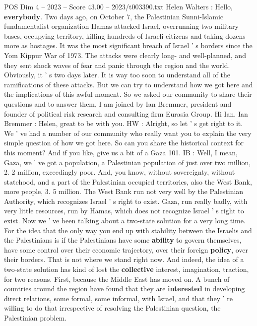 \begin{textsample}{POS Dim 4 – 2023 – Score 43.00 – 2023/t003390.txt}  \label{ex:f4_pos_031}
Helen Walters : Hello, \textbf{everybody}.
Two days ago, on October 7, the Palestinian Sunni-Islamic fundamentalist organization Hamas attacked Israel, overrunning two military bases, occupying territory, killing hundreds of Israeli citizens and taking dozens more as hostages.
It was the most significant breach of Israel ' s borders since the Yom Kippur War of 1973.
The attacks were clearly long- and well-planned, and they sent shock waves of fear and panic through the region and the world.
Obviously, it ' s two days later.
It is way too soon to understand all of the ramifications of these attacks.
But we can try to understand how we got here and the implications of this awful moment.
So we asked our community to share their questions and to answer them, I am joined by Ian Bremmer, president and founder of political risk research and consulting firm Eurasia Group.
Hi Ian.
Ian Bremmer : Helen, great to be with you.
HW : Alright, so let ' s get right to it.
We ' ve had a number of our community who really want you to explain the very simple question of how we got here.
So can you share the historical context for this moment?
And if you like, give us a bit of a Gaza 101.
IB : Well, I mean, Gaza, we ' ve got a population, a Palestinian population of just over two million, 2. 2 million, exceedingly poor.
And, you know, without sovereignty, without statehood, and a part of the Palestinian occupied territories, also the West Bank, more people, 3. 5 million.
The West Bank run not very well by the Palestinian Authority, which recognizes Israel ' s right to exist.
Gaza, run really badly, with very little resources, run by Hamas, which does not recognize Israel ' s right to exist.
Now we ' ve been talking about a two-state solution for a very long time.
For the idea that the only way you end up with stability between the Israelis and the Palestinians is if the Palestinians have some \textbf{ability} to govern themselves, have some control over their economic trajectory, over their foreign \textbf{policy}, over their borders.
That is not where we stand right now.
And indeed, the idea of a two-state solution has kind of lost the \textbf{collective} interest, imagination, traction, for two reasons.
First, because the Middle East has moved on.
A bunch of countries around the region have found that they are \textbf{interested} in developing direct relations, some formal, some informal, with Israel, and that they ' re willing to do that irrespective of resolving the Palestinian question, the Palestinian problem.

\end{textsample}
